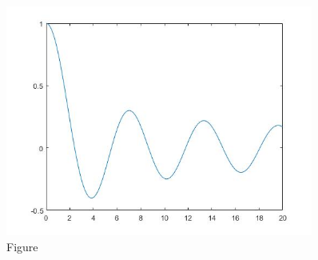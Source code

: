 \documentclass{article}
\begin{document}
        \subsection{}
            
            
    \section{}
        \subsection{}
            \paragraph{}
            
            \begin{figure}[H] 
                \centering 
                \includegraphics[width=0.9\textwidth]{img/Assignement_6_3.jpg}
                \caption{Figure} 
            \end{figure}
        \subsection{}
            
        \subsection{}
            
            
\end{document}
